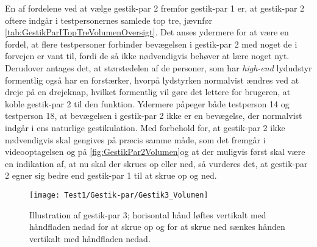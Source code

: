 En af fordelene ved at vælge gestik-par 2 fremfor gestik-par 1 er, at gestik-par 2 oftere indgår i testpersonernes samlede top tre, jævnfør \autoref{tab:GestikParITopTreVolumenOversigt}. Det anses ydermere for at være en fordel, at flere testpersoner forbinder bevægelsen i gestik-par 2 med noget de i forvejen er vant til, fordi de så ikke nødvendigvis behøver at lære noget nyt. Derudover antages det, at størstedelen af de personer, som har \textit{high-end} lydudstyr formentlig også har en forstærker, hvorpå lydstyrken normalvist ændres ved at dreje på en drejeknap, hvilket formentlig vil gøre det lettere for brugeren, at koble gestik-par 2 til den funktion. Ydermere påpeger både testperson 14 og testperson 18, at bevægelsen i gestik-par 2 ikke er en bevægelse, der normalvist indgår i ens naturlige gestikulation. Med forbehold for, at gestik-par 2 ikke nødvendigvis skal gengives på præcis samme måde, som det fremgår i videooptagelsen og på \autoref{fig:GestikPar2Volumen}og at der muligvis først skal være en indikation af, at nu skal der skrues op eller ned, så vurderes det, at gestik-par 2 egner sig bedre end gestik-par 1 til at skrue op og ned.
%
\begin{figure}[H]
	\centering
	\texttt{[image: Test1/Gestik-par/Gestik3\_Volumen]}
	\caption{Illustration af gestik-par 3; horisontal hånd løftes vertikalt med håndfladen nedad for at skrue op og for at skrue ned sænkes hånden vertikalt med håndfladen nedad.}
	\label{fig:GestikPar3Volumen}
\end{figure}
\noindent
%
